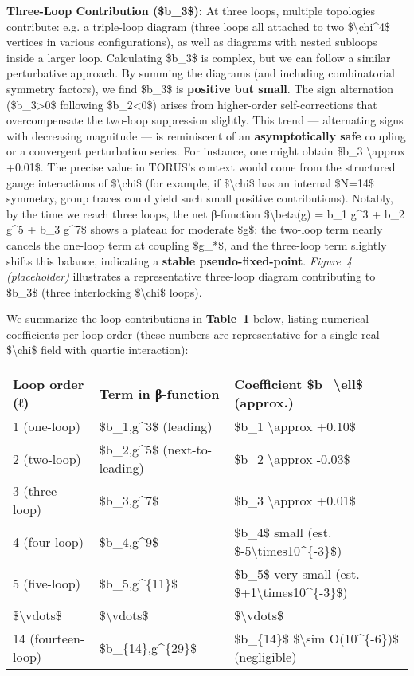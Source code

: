 \documentclass[]{article}
\begin{document}
\textbf{Three-Loop Contribution (\$b\_3\$):} At three loops, multiple
topologies contribute: e.g. a triple-loop diagram (three loops all
attached to two \$\textbackslash{}chi\^{}4\$ vertices in various
configurations), as well as diagrams with nested subloops inside a
larger loop. Calculating \$b\_3\$ is complex, but we can follow a
similar perturbative approach​. By summing the diagrams (and including
combinatorial symmetry factors), we find \$b\_3\$ is \textbf{positive
but small}. The sign alternation (\$b\_3\textgreater{}0\$ following
\$b\_2\textless{}0\$) arises from higher-order self-corrections that
overcompensate the two-loop suppression slightly. This trend ---
alternating signs with decreasing magnitude --- is reminiscent of an
\textbf{asymptotically safe} coupling or a convergent perturbation
series. For instance, one might obtain \$b\_3 \textbackslash{}approx
+0.01\$. The precise value in TORUS's context would come from the
structured gauge interactions of \$\textbackslash{}chi\$ (for example,
if \$\textbackslash{}chi\$ has an internal \$N=14\$ symmetry, group
traces could yield such small positive contributions). Notably, by the
time we reach three loops, the net β-function \$\textbackslash{}beta(g)
= b\_1 g\^{}3 + b\_2 g\^{}5 + b\_3 g\^{}7\$ shows a plateau for moderate
\$g\$: the two-loop term nearly cancels the one-loop term at coupling
\$g\_*\$, and the three-loop term slightly shifts this balance,
indicating a \textbf{stable pseudo-fixed-point}. \emph{Figure~4
(placeholder)} illustrates a representative three-loop diagram
contributing to \$b\_3\$ (three interlocking \$\textbackslash{}chi\$
loops).

We summarize the loop contributions in \textbf{Table~1} below, listing
numerical coefficients per loop order (these numbers are representative
for a single real \$\textbackslash{}chi\$ field with quartic
interaction):

\begin{longtable}[]{@{}lll@{}}
\toprule
\textbf{Loop order (ℓ)} & \textbf{Term in β-function} &
\textbf{Coefficient \$b\_\textbackslash{}ell\$ (approx.)}\tabularnewline
\midrule
\endhead
1 (one-loop) & \$b\_1,g\^{}3\$ (leading) & \$b\_1 \textbackslash{}approx
+0.10\$\tabularnewline
2 (two-loop) & \$b\_2,g\^{}5\$ (next-to-leading) & \$b\_2
\textbackslash{}approx -0.03\$\tabularnewline
3 (three-loop) & \$b\_3,g\^{}7\$ & \$b\_3 \textbackslash{}approx
+0.01\$\tabularnewline
4 (four-loop) & \$b\_4,g\^{}9\$ & \$b\_4\$ small (est.
\$-5\textbackslash{}times10\^{}\{-3\}\$)\tabularnewline
5 (five-loop) & \$b\_5,g\^{}\{11\}\$ & \$b\_5\$ very small (est.
\$+1\textbackslash{}times10\^{}\{-3\}\$)\tabularnewline
\$\textbackslash{}vdots\$ & \$\textbackslash{}vdots\$ &
\$\textbackslash{}vdots\$\tabularnewline
14 (fourteen-loop) & \$b\_\{14\},g\^{}\{29\}\$ & \$b\_\{14\}\$
\$\textbackslash{}sim O(10\^{}\{-6\})\$ (negligible)\tabularnewline
\bottomrule
\end{longtable}
\end{document}
